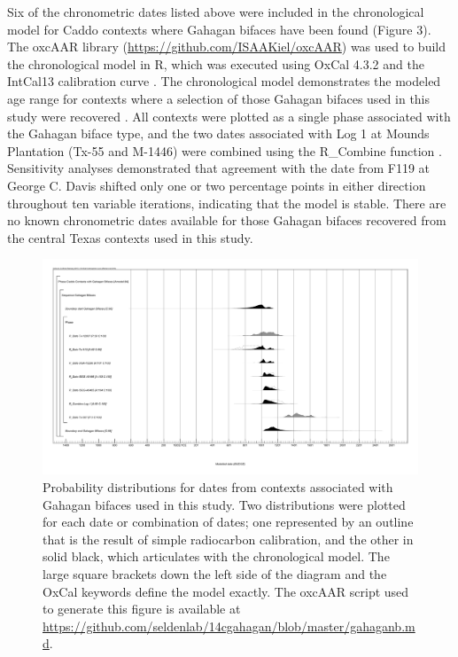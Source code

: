 \documentclass[review]{elsarticle}
\begin{document}
Six of the chronometric dates listed above were included in the chronological model for Caddo contexts where Gahagan bifaces have been found (Figure 3). The oxcAAR library (\href{https://github.com/ISAAKiel/oxcAAR}{https://github.com/ISAAKiel/oxcAAR}) was used to build the chronological model in R, which was executed using OxCal 4.3.2 \citep{RN5514,RN20716} and the IntCal13 calibration curve \citep{RN4406}. The chronological model demonstrates the modeled age range for contexts where a selection of those Gahagan bifaces used in this study were recovered \citep{RN20850}. All contexts were plotted as a single phase associated with the Gahagan biface type, and the two dates associated with Log 1 at Mounds Plantation (Tx-55 and M-1446) were combined using the R\_Combine function \citep{RN20850}. Sensitivity analyses demonstrated that agreement with the date from F119 at George C. Davis shifted only one or two percentage points in either direction throughout ten variable iterations, indicating that the model is stable. There are no known chronometric dates available for those Gahagan bifaces recovered from the central Texas contexts used in this study.

\begin{figure}[ht]\centering
\includegraphics[width=\linewidth]{fig03}
\caption{Probability distributions for dates from contexts associated with Gahagan bifaces used in this study. Two distributions were plotted for each date or combination of dates; one represented by an outline that is the result of simple radiocarbon calibration, and the other in solid black, which articulates with the chronological model. The large square brackets down the left side of the diagram and the OxCal keywords define the model exactly. The oxcAAR script used to generate this figure is available at \href{https://github.com/seldenlab/14cgahagan/blob/master/gahaganb.md}{https://github.com/seldenlab/14cgahagan/blob/master/gahaganb.md}.}
\label{fig:fig3}
\end{figure}
\end{document}
